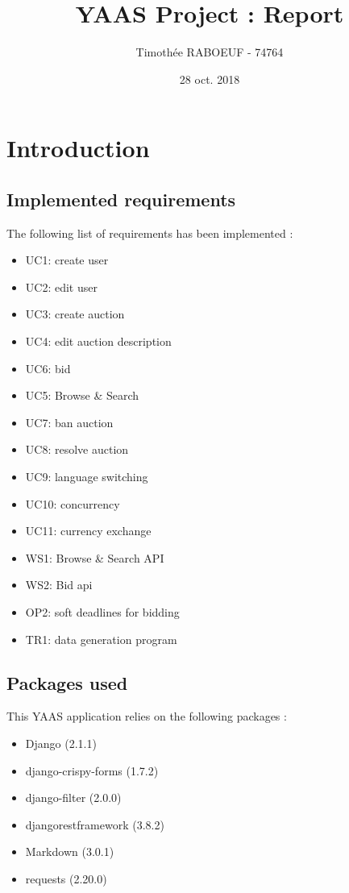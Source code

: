 \documentclass[a4paper, 11pt]{report}
\title{YAAS Project : Report}
\author{Timothée RABOEUF - 74764}
\date{28 oct. 2018}
\begin{document}
 
\maketitle
\tableofcontents
    
\chapter{Introduction}

    \section{Implemented requirements}

    The following list of requirements has been implemented : 
    \begin{itemize}
        \item UC1: create user
        \item UC2: edit user
        \item UC3: create auction
        \item UC4: edit auction description
        \item UC6: bid
        \item UC5: Browse \& Search
        \item UC7: ban auction
        \item UC8: resolve auction
        \item UC9: language switching
        \item UC10: concurrency
        \item UC11: currency exchange
        \item WS1: Browse \& Search API
        \item WS2: Bid api
        \item OP2: soft deadlines for bidding
        \item TR1: data generation program

    \end{itemize}

    \section{Packages used}
    This YAAS application relies on the following packages :
    \begin{itemize}
        \item Django (2.1.1)
        \item django-crispy-forms (1.7.2)
        \item django-filter (2.0.0) 
        \item djangorestframework (3.8.2)
        \item Markdown (3.0.1)
        \item requests (2.20.0)
        
    \end{itemize}
\end{document}
